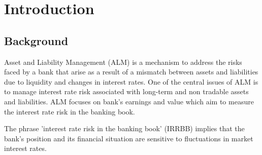 \documentclass[11pt]{article}
\begin{document}
%








\section{Introduction}


\subsection{Background}

Asset and Liability Management (ALM) is a mechanism to address the risks faced by a
bank that arise as a result of a mismatch between assets and liabilities due to liquidity and changes in interest rates. One of the central issues of ALM is to manage interest rate risk associated with long-term and non tradable assets and liabilities. ALM focuses on bank’s earnings and value which aim to measure the interest rate risk in the banking book.


The phrase ’interest rate risk in the banking book’ (IRRBB) implies that the bank’s position and its financial situation are sensitive to fluctuations in market interest rates.\\
\end{document}
